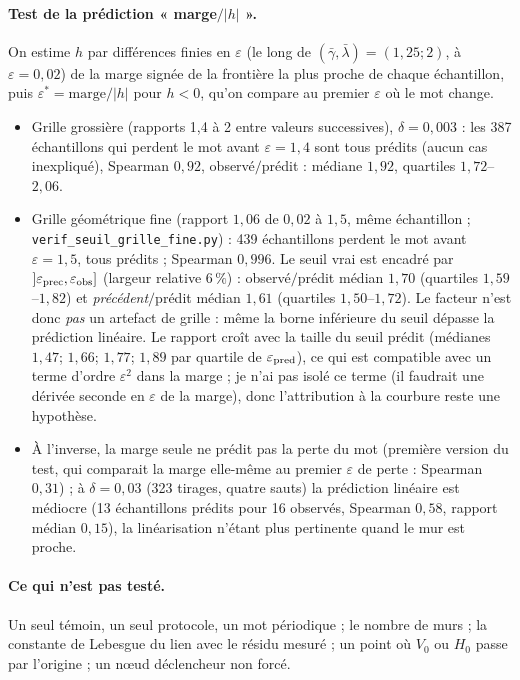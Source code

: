 \documentclass[11pt,a4paper]{article}
\theoremstyle{remark}
\theoremstyle{definition}
\newcommand{\eps}{\varepsilon}
\begin{document}
\paragraph{Test de la prédiction « marge$/|h|$ ».} On estime $h$ par différences finies en $\eps$ (le long de $(\bar\gamma,\bar\lambda)=(1{,}25;2)$, à $\eps=0{,}02$) de la marge signée de la frontière la plus proche de chaque échantillon, puis $\eps^\ast=\text{marge}/|h|$ pour $h<0$, qu'on compare au premier $\eps$ où le mot change.
\begin{itemize}[nosep]
\item Grille grossière (rapports 1,4 à 2 entre valeurs successives), $\delta=0{,}003$ : les 387 échantillons qui perdent le mot avant $\eps=1{,}4$ sont tous prédits (aucun cas inexpliqué), Spearman $0{,}92$, observé$/$prédit : médiane $1{,}92$, quartiles $1{,}72$--$2{,}06$.
\item Grille géométrique fine (rapport $1{,}06$ de $0{,}02$ à $1{,}5$, même échantillon ; \texttt{verif\_seuil\_grille\_fine.py}) : 439 échantillons perdent le mot avant $\eps=1{,}5$, tous prédits ; Spearman $0{,}996$. Le seuil vrai est encadré par $]\eps_{\rm prec},\eps_{\rm obs}]$ (largeur relative $6\,\%$) : observé$/$prédit médian $1{,}70$ (quartiles $1{,}59$--$1{,}82$) et \emph{précédent}$/$prédit médian $1{,}61$ (quartiles $1{,}50$--$1{,}72$). Le facteur n'est donc \emph{pas} un artefact de grille : même la borne inférieure du seuil dépasse la prédiction linéaire. Le rapport croît avec la taille du seuil prédit (médianes $1{,}47$; $1{,}66$; $1{,}77$; $1{,}89$ par quartile de $\eps_{\rm pred}$), ce qui est compatible avec un terme d'ordre $\eps^2$ dans la marge ; je n'ai pas isolé ce terme (il faudrait une dérivée seconde en $\eps$ de la marge), donc l'attribution à la courbure reste une hypothèse.
\item À l'inverse, la marge seule ne prédit pas la perte du mot (première version du test, qui comparait la marge elle-même au premier $\eps$ de perte : Spearman $0{,}31$) ; à $\delta=0{,}03$ (323 tirages, quatre sauts) la prédiction linéaire est médiocre (13 échantillons prédits pour 16 observés, Spearman $0{,}58$, rapport médian $0{,}15$), la linéarisation n'étant plus pertinente quand le mur est proche.
\end{itemize}

\paragraph{Ce qui n'est pas testé.} Un seul témoin, un seul protocole, un mot périodique ; le nombre de murs ; la constante de Lebesgue du lien avec le résidu mesuré ; un point où $V_0$ ou $H_0$ passe par l'origine ; un n\oe ud déclencheur non forcé.
\end{document}
